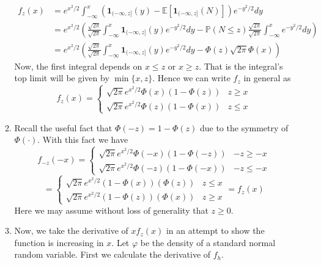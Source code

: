 \documentclass[12pt]{article}  %
\newcommand{\E}{{\mathbb{E}}}
\newcommand{\prob}{{\mathbb{P}}}
\newcommand{\ind}{{\mathbf{1}}}
\begin{document}
\begin{enumerate}
\begin{enumerate}
\begin{align*}
f_z(x) &= e^{x^2/2}\int_{-\infty}^x\left(\ind_{(-\infty, z]}(y)-\E[\ind_{(-\infty, z]}(N)]\right)e^{-y^2/2}dy\\
&= e^{x^2/2}\left(\frac{\sqrt{2\pi}}{\sqrt{2\pi}}\int_{-\infty}^x\ind_{(-\infty, z]}(y)e^{-y^2/2}dy - \prob(N\leq z)\frac{\sqrt{2\pi}}{\sqrt{2\pi}}\int_{-\infty}^{x}e^{-y^2/2}dy\right)\\
&= e^{x^2/2}\left(\frac{\sqrt{2\pi}}{\sqrt{2\pi}}\int_{-\infty}^x\ind_{(-\infty, z]}(y)e^{-y^2/2}dy - \Phi(z)\sqrt{2\pi}\Phi(x)\right)
\end{align*}
Now, the first integral depends on $x\leq z$ or $x\geq z$. That is the integral's top limit will be given by $\min\{x,z\}$. Hence we can write $f_z$ in general as 
\[f_z(x) = 
\begin{cases}
\sqrt{2\pi}e^{x^2/2}\Phi(x)(1-\Phi(z)) & z\geq x\\
\sqrt{2\pi}e^{x^2/2}\Phi(z)(1-\Phi(x)) & z\leq x 
\end{cases}\]
\item Recall the useful fact that $\Phi(-z) = 1-\Phi(z)$ due to the symmetry of $\Phi(\cdot)$. With this fact we have 
\[f_{-z}(-x) = 
\begin{cases}
\sqrt{2\pi}e^{x^2/2}\Phi(-x)(1-\Phi(-z)) & -z\geq -x\\
\sqrt{2\pi}e^{x^2/2}\Phi(-z)(1-\Phi(-x)) & -z\leq -x 
\end{cases}\]
\[=
\begin{cases}
\sqrt{2\pi}e^{x^2/2}(1-\Phi(x))(\Phi(z)) & z\leq x\\
\sqrt{2\pi}e^{x^2/2}(1-\Phi(z))(\Phi(x)) & z\geq x 
\end{cases} = f_z(x)\] 
Here we may assume without loss of generality that $z\geq 0$. 
\item Now, we take the derivative of $xf_z(x)$ in an attempt to show the function is increasing in $x$. Let $\varphi$ be the density of a standard normal random variable. First we calculate the derivative of $f_h$. 


\end{enumerate}
\end{enumerate}
\end{document}
